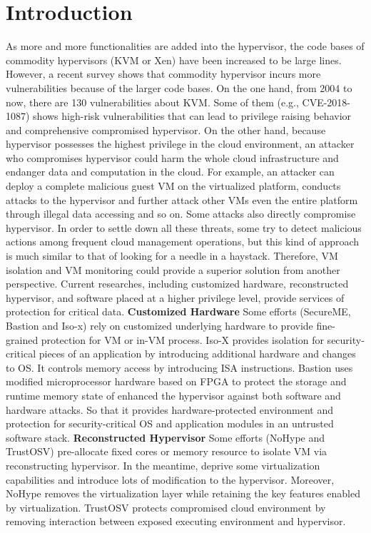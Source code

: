 \documentclass[conference]{IEEEtran}
\begin{document}
\section{Introduction}
As more and more functionalities are added into the hypervisor, the code bases of commodity hypervisors (KVM or Xen) have been increased to be large lines. However, a recent survey shows that commodity hypervisor incurs more vulnerabilities because of the larger code bases. 
On the one hand, from 2004 to now, there are 130 vulnerabilities about KVM.
Some of them (e.g., CVE-2018-1087)
shows high-risk vulnerabilities that can lead to privilege raising behavior and comprehensive compromised hypervisor.
On the other hand, because hypervisor possesses the highest privilege in the cloud environment, an attacker who compromises hypervisor could harm the whole cloud infrastructure and endanger data and computation in the cloud. For example, an attacker can deploy a complete malicious guest VM on the virtualized platform, conducts attacks to the hypervisor and further attack other VMs even the entire platform through illegal data accessing and so on. Some attacks also directly compromise hypervisor.
In order to settle down all these threats, some try to detect malicious actions among frequent cloud management operations, but this kind of approach is much similar to that of looking for a needle in a haystack. Therefore, VM isolation and VM monitoring could provide a superior solution from another perspective. 
Current researches, including customized hardware, reconstructed hypervisor, and software placed at a higher privilege level, provide services of protection for critical data.
\textbf{Customized Hardware }
Some efforts (SecureME\cite{Chhabra2011SecureME}, Bastion\cite{Champagne2010Scalable} and Iso-x\cite{Evtyushkin2015Iso}) rely on 
customized underlying hardware to provide fine-grained protection for VM or in-VM process. 
Iso-X provides isolation for security-critical pieces of an application by introducing additional hardware and changes to OS. It controls memory access by introducing ISA instructions. 
Bastion uses modified microprocessor hardware based on FPGA to protect the storage and runtime memory state of enhanced the hypervisor against both software and hardware attacks. So that it provides hardware-protected environment and protection for security-critical OS and application modules in an untrusted software stack. 
\textbf{Reconstructed Hypervisor }
Some efforts (NoHype\cite{NoHype} and TrustOSV\cite{TrustOSV}) pre-allocate fixed cores or memory resource to isolate VM via reconstructing hypervisor. In the meantime, deprive some virtualization capabilities and introduce lots of modification to the hypervisor. Moreover, NoHype removes the virtualization layer while retaining the key features enabled by virtualization. TrustOSV protects compromised cloud environment by removing interaction between exposed executing environment and hypervisor.
\end{document}
